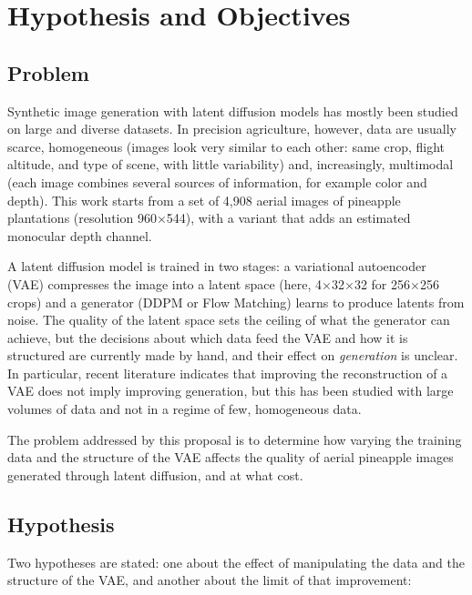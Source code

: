 \renewcommand{\baselinestretch}{1.5}

\chapter{Hypothesis and Objectives}

\section{Problem}

Synthetic image generation with latent diffusion models has mostly been studied on large and diverse datasets. In precision agriculture, however, data are usually scarce, homogeneous (images look very similar to each other: same crop, flight altitude, and type of scene, with little variability) and, increasingly, multimodal (each image combines several sources of information, for example color and depth). This work starts from a set of 4,908 aerial images of pineapple plantations (resolution 960$\times$544), with a variant that adds an estimated monocular depth channel.

A latent diffusion model is trained in two stages: a variational autoencoder (VAE) compresses the image into a latent space (here, 4$\times$32$\times$32 for 256$\times$256 crops) and a generator (DDPM or Flow Matching) learns to produce latents from noise. The quality of the latent space sets the ceiling of what the generator can achieve, but the decisions about which data feed the VAE and how it is structured are currently made by hand, and their effect on \emph{generation} is unclear. In particular, recent literature indicates that improving the reconstruction of a VAE does not imply improving generation, but this has been studied with large volumes of data and not in a regime of few, homogeneous data.

The problem addressed by this proposal is to determine how varying the training data and the structure of the VAE affects the quality of aerial pineapple images generated through latent diffusion, and at what cost.

\section{Hypothesis}

Two hypotheses are stated: one about the effect of manipulating the data and the structure of the VAE, and another about the limit of that improvement:

